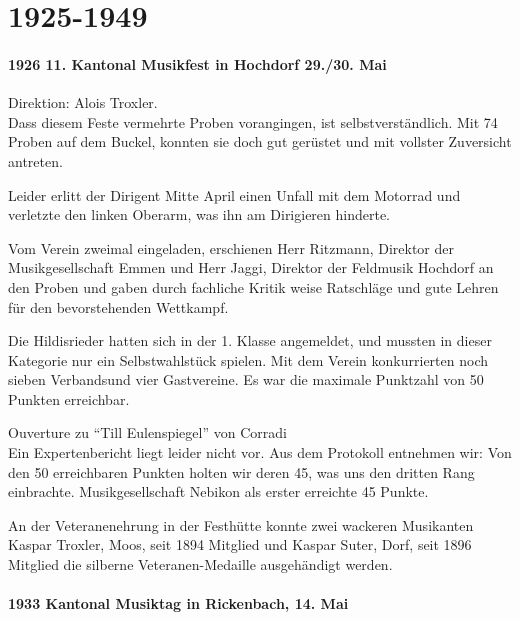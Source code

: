 \chapter{1925-1949}

\begin{history}

    \subsubsection*{1926 11. Kantonal Musikfest in Hochdorf 29./30. Mai}

    Direktion: Alois Troxler.\\
    Dass diesem Feste vermehrte Proben vorangingen, ist selbstverständlich. Mit
    74 Proben auf dem Buckel, konnten sie doch gut gerüstet und mit vollster
    Zuversicht antreten.

    Leider erlitt der Dirigent Mitte April einen Unfall mit dem Motorrad und
    verletzte den linken Oberarm, was ihn am Dirigieren hinderte.

    Vom Verein zweimal eingeladen, erschienen Herr Ritzmann, Direktor der
    Musikgesellschaft Emmen und Herr Jaggi, Direktor der Feldmusik Hochdorf an
    den Proben und gaben durch fachliche Kritik weise Ratschläge und gute Lehren
    für den bevorstehenden Wettkampf.

    Die Hildisrieder hatten sich in der 1. Klasse angemeldet, und mussten in
    dieser Kategorie nur ein Selbstwahlstück spielen. Mit dem Verein
    konkurrierten noch sieben Verbandsund vier Gastvereine. Es war die maximale
    Punktzahl von 50 Punkten erreichbar.

    Ouverture zu \enquote{Till Eulenspiegel} von Corradi\\
    Ein Expertenbericht liegt leider nicht vor. Aus dem Protokoll entnehmen wir:
    Von den 50 erreichbaren Punkten holten wir deren 45, was uns den dritten
    Rang einbrachte. Musikgesellschaft Nebikon als erster erreichte 45 Punkte.

    An der Veteranenehrung in der Festhütte konnte zwei wackeren Musikanten
    Kaspar Troxler, Moos, seit 1894 Mitglied und Kaspar Suter, Dorf, seit 1896
    Mitglied die silberne Veteranen-Medaille ausgehändigt werden.


    \subsubsection*{1933 Kantonal Musiktag in Rickenbach, 14. Mai}


\end{history}
